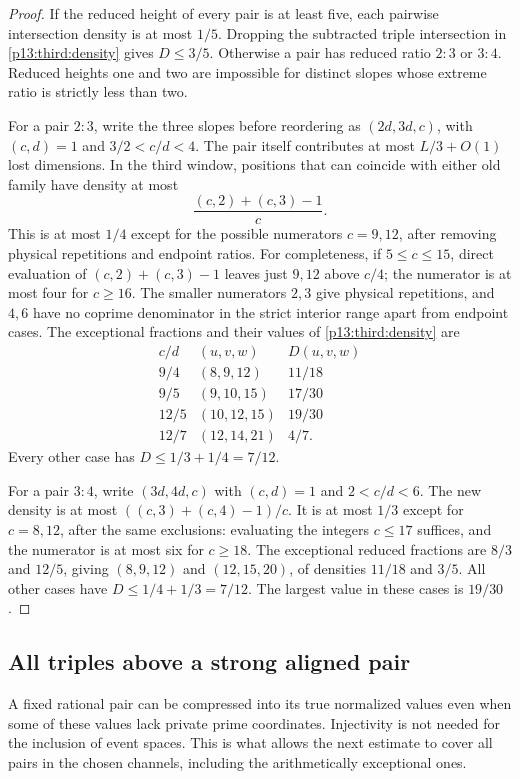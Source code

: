\begin{proof}
If the reduced height of every pair is at least five, each pairwise
intersection density is at most $1/5$.  Dropping the subtracted triple
intersection in \eqref{p13:third:density} gives $D\leq3/5$.
Otherwise a pair has reduced ratio $2:3$ or $3:4$.  Reduced heights one
and two are impossible for distinct slopes whose extreme ratio is
strictly less than two.

For a pair $2:3$, write the three slopes before reordering as
$(2d,3d,c)$, with $(c,d)=1$ and $3/2<c/d<4$.
The pair itself contributes at most $L/3+O(1)$ lost dimensions.
In the third window, positions that can coincide with either old family
have density at most
\[
 \frac{(c,2)+(c,3)-1}{c}.
\]
This is at most $1/4$ except for the possible numerators $c=9,12$,
after removing physical repetitions and endpoint ratios.
For completeness, if $5\leq c\leq15$, direct evaluation of
$(c,2)+(c,3)-1$ leaves just $9,12$ above $c/4$; the numerator is at most
four for $c\geq16$.  The smaller numerators $2,3$ give physical
repetitions, and $4,6$ have no coprime denominator in the strict
interior range apart from endpoint cases.  The exceptional fractions
and their values of \eqref{p13:third:density} are
\[
 \begin{array}{c|c|c}
 c/d & (u,v,w)&D(u,v,w)\\ \hline
 9/4&(8,9,12)&11/18\\
 9/5&(9,10,15)&17/30\\
 12/5&(10,12,15)&19/30\\
 12/7&(12,14,21)&4/7.
 \end{array}
\]
Every other case has $D\leq1/3+1/4=7/12$.

For a pair $3:4$, write $(3d,4d,c)$ with $(c,d)=1$ and
$2<c/d<6$.  The new density is at most
$((c,3)+(c,4)-1)/c$.  It is at most $1/3$ except for $c=8,12$,
after the same exclusions: evaluating the integers $c\leq17$ suffices,
and the numerator is at most six for $c\geq18$.
The exceptional reduced fractions are $8/3$ and $12/5$, giving
$(8,9,12)$ and $(12,15,20)$, of densities $11/18$ and $3/5$.
All other cases have $D\leq1/4+1/3=7/12$.
The largest value in these cases is $19/30$.
\end{proof}

\subsection{All triples above a strong aligned pair}

A fixed rational pair can be compressed into its true normalized values
even when some of these values lack private prime coordinates.
Injectivity is not needed for the inclusion of event spaces.  This is
what allows the next estimate to cover all pairs in the chosen channels,
including the arithmetically exceptional ones.

